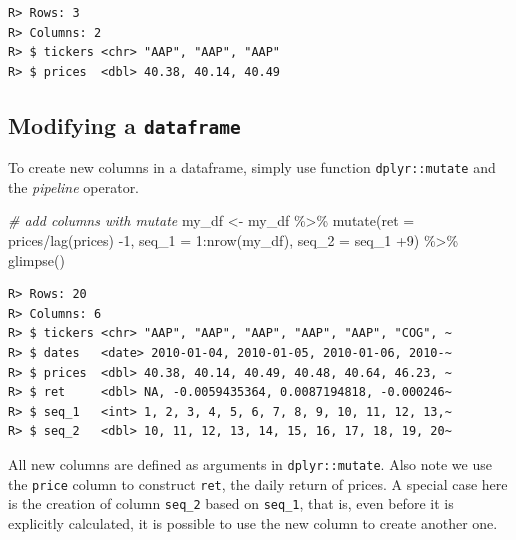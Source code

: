 \documentclass[
  12pt,
]{book}
\newenvironment{Shaded}{\begin{snugshade}}{\end{snugshade}}
\newcommand{\AttributeTok}[1]{\textcolor[rgb]{0.61,0.61,0.61}{#1}}
\newcommand{\CommentTok}[1]{\textcolor[rgb]{0.37,0.37,0.37}{\textit{#1}}}
\newcommand{\DecValTok}[1]{\textcolor[rgb]{0.06,0.06,0.06}{#1}}
\newcommand{\FunctionTok}[1]{\textcolor[rgb]{0,0,0}{#1}}
\newcommand{\NormalTok}[1]{#1}
\newcommand{\OtherTok}[1]{\textcolor[rgb]{0.37,0.37,0.37}{#1}}
\newcommand{\SpecialCharTok}[1]{\textcolor[rgb]{0,0,0}{#1}}
\begin{document}
\begin{verbatim}
R> Rows: 3
R> Columns: 2
R> $ tickers <chr> "AAP", "AAP", "AAP"
R> $ prices  <dbl> 40.38, 40.14, 40.49
\end{verbatim}

\hypertarget{modifying-a-dataframe}{%
\subsection{\texorpdfstring{Modifying a \texttt{dataframe}}{Modifying a dataframe}}\label{modifying-a-dataframe}}

To create new columns in a dataframe, simply use function \texttt{dplyr::mutate} and the \emph{pipeline} operator.  

\begin{Shaded}
\begin{Highlighting}[]
\CommentTok{\# add columns with mutate}
\NormalTok{my\_df }\OtherTok{\textless{}{-}}\NormalTok{ my\_df }\SpecialCharTok{\%\textgreater{}\%}
  \FunctionTok{mutate}\NormalTok{(}\AttributeTok{ret =}\NormalTok{ prices}\SpecialCharTok{/}\FunctionTok{lag}\NormalTok{(prices) }\SpecialCharTok{{-}}\DecValTok{1}\NormalTok{,}
         \AttributeTok{seq\_1 =} \DecValTok{1}\SpecialCharTok{:}\FunctionTok{nrow}\NormalTok{(my\_df),}
         \AttributeTok{seq\_2 =}\NormalTok{  seq\_1 }\SpecialCharTok{+}\DecValTok{9}\NormalTok{) }\SpecialCharTok{\%\textgreater{}\%}
  \FunctionTok{glimpse}\NormalTok{()}
\end{Highlighting}
\end{Shaded}

\begin{verbatim}
R> Rows: 20
R> Columns: 6
R> $ tickers <chr> "AAP", "AAP", "AAP", "AAP", "AAP", "COG", ~
R> $ dates   <date> 2010-01-04, 2010-01-05, 2010-01-06, 2010-~
R> $ prices  <dbl> 40.38, 40.14, 40.49, 40.48, 40.64, 46.23, ~
R> $ ret     <dbl> NA, -0.0059435364, 0.0087194818, -0.000246~
R> $ seq_1   <int> 1, 2, 3, 4, 5, 6, 7, 8, 9, 10, 11, 12, 13,~
R> $ seq_2   <dbl> 10, 11, 12, 13, 14, 15, 16, 17, 18, 19, 20~
\end{verbatim}

All new columns are defined as arguments in \texttt{dplyr::mutate}. Also note we use the \texttt{price} column to construct \texttt{ret}, the daily return of prices. A special case here is the creation of column \texttt{seq\_2} based on \texttt{seq\_1}, that is, even before it is explicitly calculated, it is possible to use the new column to create another one.
\end{document}
